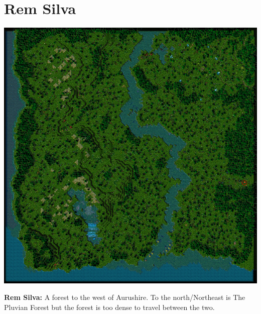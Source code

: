 \section{Rem Silva}
\begin{center}
	\includegraphics[width=\linewidth]{img/RemSilva.png}
	
	{\textbf{Rem Silva:} A forest to the west of Aurushire. To the north/Northeast is The Pluvian Forest but the forest is too dense to travel between the two.}
\end{center}

